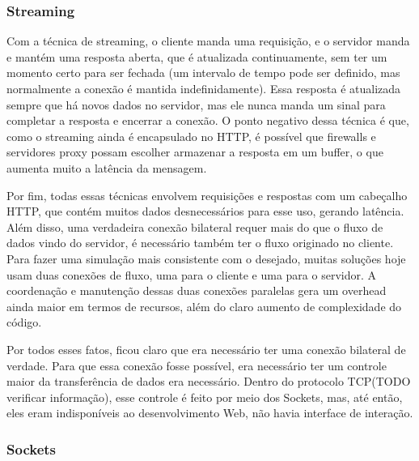 \documentclass[a4paper,12pt]{article}
\begin{document}


\subsubsection{Streaming}

Com a técnica de streaming, o cliente manda uma requisição, e o servidor manda e mantém uma resposta aberta, que é atualizada continuamente, sem ter um momento certo para ser fechada (um intervalo de tempo pode ser definido, mas normalmente a conexão é mantida indefinidamente). Essa resposta é atualizada sempre que há novos dados no servidor, mas ele nunca manda um sinal para completar a resposta e encerrar a conexão. O ponto negativo dessa técnica é que, como o streaming ainda é encapsulado no HTTP, é possível que firewalls e servidores proxy possam escolher armazenar a resposta em um buffer, o que aumenta muito a latência da mensagem.


Por fim, todas essas técnicas envolvem requisições e respostas com um cabeçalho HTTP, que contém muitos dados desnecessários para esse uso, gerando latência. Além disso, uma verdadeira conexão bilateral requer mais do que o fluxo de dados vindo do servidor, é necessário também ter o fluxo originado no cliente. Para fazer uma simulação mais consistente com o desejado, muitas soluções hoje usam duas conexões de fluxo, uma para o cliente e uma para o servidor. A coordenação e manutenção dessas duas conexões paralelas gera um overhead ainda maior em termos de recursos, além do claro aumento de complexidade do código.

Por todos esses fatos, ficou claro que era necessário ter uma conexão bilateral de verdade. Para que essa conexão fosse possível, era necessário ter um controle maior da transferência de dados era necessário. Dentro do protocolo TCP(TODO verificar informação), esse controle é feito por meio dos Sockets, mas, até então, eles eram indisponíveis ao desenvolvimento Web, não havia interface de interação.


\subsubsection{Sockets}
\end{document}

